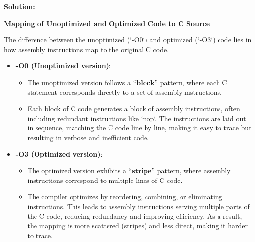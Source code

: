 \textbf{Solution:}

\textbf{Mapping of Unoptimized and Optimized Code to C Source}

The difference between the unoptimized (`-O0`) and optimized (`-O3`) code lies in how assembly instructions map to the original C code.

\begin{itemize}
    \item \textbf{-O0 (Unoptimized version)}:
    \begin{itemize}
        \item The unoptimized version follows a $\boxed{\textbf{“block”}}$ pattern, where each C statement corresponds directly to a set of assembly instructions.
        \item Each block of C code generates a block of assembly instructions, often including redundant instructions like `nop`. The instructions are laid out in sequence, matching the C code line by line, making it easy to trace but resulting in verbose and inefficient code.
    \end{itemize}

    \item \textbf{-O3 (Optimized version)}:
    \begin{itemize}
        \item The optimized version exhibits a $\boxed{\textbf{“stripe”}}$ pattern, where assembly instructions correspond to multiple lines of C code.
        \item The compiler optimizes by reordering, combining, or eliminating instructions. This leads to assembly instructions serving multiple parts of the C code, reducing redundancy and improving efficiency. As a result, the mapping is more scattered (stripes) and less direct, making it harder to trace.
    \end{itemize}
\end{itemize}